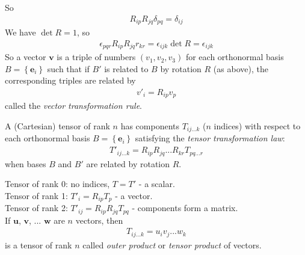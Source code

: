 \documentclass[a4paper]{article}
\begin{document}
So 
\begin{equation}\label{eq:11}
\begin{aligned}
R_{ip} R_{jq}\delta_{pq} = \delta_{ij}
\end{aligned}
\end{equation}
We have $\det R = 1$, so
\begin{equation}\label{eq:12}
\begin{aligned}
\epsilon_{pqr} R_{ip} R_{jq} r_{kr} = \epsilon_{ijk} \det R = \epsilon_{ijk}
\end{aligned}
\end{equation}
So a vector $\mathbf{v}$ is a triple of numbers $\left(v_1,v_2,v_3\right)$ for each orthonormal basis $B=\left\{\mathbf{e}_i\right\}$ such that if $B'$ is related to $B$ by rotation $R$ (as above), the corresponding triples are related by
\begin{equation*}
\begin{aligned}
v'_i = R_{ip} v_p
\end{aligned}
\end{equation*}
called the \emph{vector transformation rule}.

\begin{defi}
A (Cartesian) tensor of rank $n$ has components $T_{ij...k}$ ($n$ indices) with respect to each orthonormal basis $B=\left\{\mathbf{e}_i\right\}$ satisfying the \emph{tensor transformation law}:
\begin{equation*}
\begin{aligned}
T'_{ij...k} = R_{ip} R_{jq} ... R_{kr} T_{pq...r}
\end{aligned}
\end{equation*}
when bases $B$ and $B'$ are related by rotation $R$.
\end{defi}

\begin{eg}
Tensor of rank 0: no indices, $T=T'$ -  a scalar.\\
Tensor of rank 1: $T'_i = R_{ip} T_p$ - a vector.\\
Tensor of rank 2: $T'_{ij} = R_{ip} R_{jq} T_{pq}$ - components form a matrix.\\
If $\mathbf{u}$, $\mathbf{v}$, ... $\mathbf{w}$ are $n$ vectors, then 
\begin{equation*}
\begin{aligned}
T_{ij...k} = u_i v_j ... w_k
\end{aligned}
\end{equation*}
is a tensor of rank $n$ called \emph{outer product} or \emph{tensor product} of vectors.
\end{eg}
\end{document}
